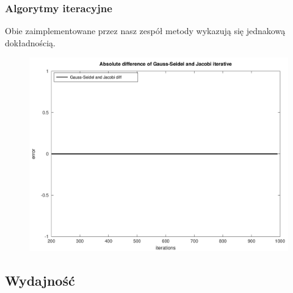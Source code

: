 \documentclass[10pt]{article}
\begin{document}
\subsubsection{Algorytmy iteracyjne}
Obie zaimplementowane przez nasz zespół metody wykazują się jednakową dokładnością.
\begin{figure}[h]
\centering
\includegraphics[scale=0.45]{plots/03_abs_iterative_methods_all_rows.png}
\end{figure}
\subsection {Wydajność}
\end{document}
